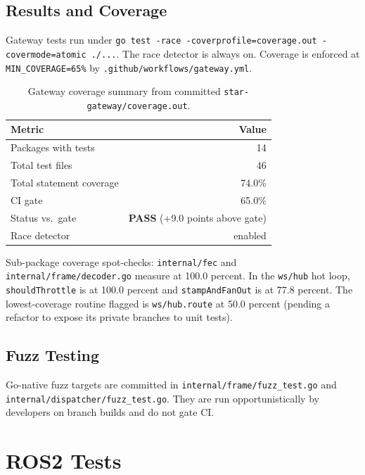 \documentclass[11pt,letterpaper]{article}
\newcommand{\pass}{{\color{passgreen}\textbf{PASS}}}
\begin{document}
\subsection{Results and Coverage}
Gateway tests run under \texttt{go test -race
-coverprofile=coverage.out -covermode=atomic ./...}. The race
detector is always on. Coverage is enforced at
\texttt{MIN\_COVERAGE=65\%} by
\texttt{.github/workflows/gateway.yml}.

\begin{table}[H]
\centering
\caption{Gateway coverage summary from committed
\texttt{star-gateway/coverage.out}.}
\label{tab:gw-cov}
\small
\begin{tabular}{l r}
\toprule
\textbf{Metric} & \textbf{Value} \\
\midrule
Packages with tests          & 14 \\
Total test files             & 46 \\
Total statement coverage     & 74.0\% \\
CI gate                      & 65.0\% \\
Status vs.\ gate             & \pass{} (+9.0 points above gate) \\
Race detector                & enabled \\
\bottomrule
\end{tabular}
\end{table}

Sub-package coverage spot-checks: \texttt{internal/fec} and
\texttt{internal/frame/decoder.go} measure at 100.0 percent. In
the \texttt{ws/hub} hot loop, \texttt{shouldThrottle} is at
100.0 percent and \texttt{stampAndFanOut} is at 77.8 percent. The
lowest-coverage routine flagged is \texttt{ws/hub.route} at
50.0 percent (pending a refactor to expose its private branches
to unit tests).

\subsection{Fuzz Testing}
Go-native fuzz targets are committed in
\texttt{internal/frame/fuzz\_test.go} and
\texttt{internal/dispatcher/fuzz\_test.go}. They are run
opportunistically by developers on branch builds and do not gate CI.

\section{ROS2 Tests}
\label{sec:ros2}
\end{document}
